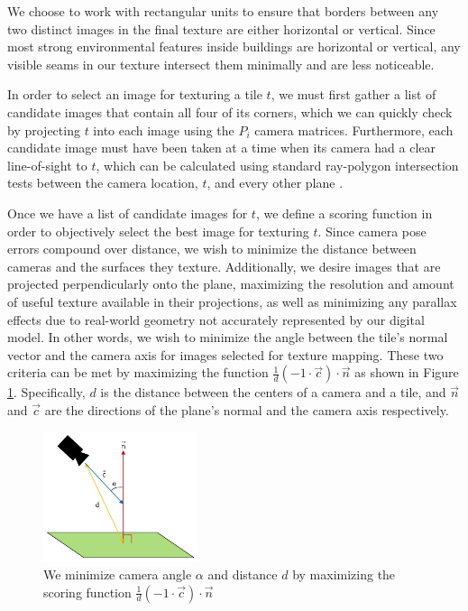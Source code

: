\documentclass[]{spie}  %
\begin{document}
We choose to work with rectangular units to ensure that borders
between any two distinct images in the final texture are either
horizontal or vertical. Since most strong environmental features
inside buildings are horizontal or vertical, any visible seams in our
texture intersect them minimally and are less noticeable.

In order to select an image for texturing a tile $t$, we must first
gather a list of candidate images that contain all four of its
corners, which we can quickly check by projecting $t$ into each image
using the $P_i$ camera matrices. Furthermore, each candidate image
must have been taken at a time when its camera had a clear
line-of-sight to $t$, which can be calculated using standard
ray-polygon intersection tests between the camera location, $t$, and
every other plane \cite{rayintersection}.

Once we have a list of candidate images for $t$, we define a scoring
function in order to objectively select the best image for texturing
$t$. Since camera pose errors compound over distance, we wish to
minimize the distance between cameras and the surfaces they
texture. Additionally, we desire images that are projected
perpendicularly onto the plane, maximizing the resolution and amount
of useful texture available in their projections, as well as
minimizing any parallax effects due to real-world geometry not
accurately represented by our digital model. In other words, we wish
to minimize the angle between the tile's normal vector and the camera
axis for images selected for texture mapping. These two criteria can
be met by maximizing the function $\frac{1}{d} (-1 \cdot \vec{c})
\cdot \vec{n}$ as shown in Figure
\ref{fig:scoringFunction}. Specifically, $d$ is the distance between
the centers of a camera and a tile, and $\vec{n}$ and $\vec{c}$ are
the directions of the plane's normal and the camera axis respectively.

\begin{figure}
  \centering
  \includegraphics[height=1.5in]{scoringFunction.jpg}
  \caption{We minimize camera angle $\alpha$ and distance $d$ by
    maximizing the scoring function $\frac{1}{d} (-1 \cdot \vec{c})
    \cdot \vec{n}$}
  \label{fig:scoringFunction}
\end{figure}
\end{document}

